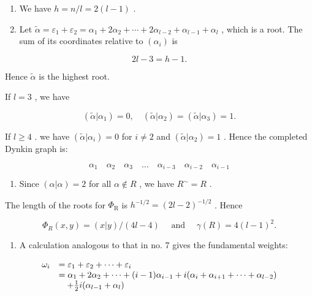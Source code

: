 \begin{enumerate}
\def\labelenumi{(\Roman{enumi})}
\setcounter{enumi}{2}
\item
  We have \(h = n / l = 2(l - 1)\) .
\item
  Let \(\tilde{\alpha} = \varepsilon_{1} + \varepsilon_{2} = \alpha_{1} + 2\alpha_{2} + \cdots + 2\alpha_{l-2} + \alpha_{l-1} + \alpha_{l}\) , which is a root. The sum of its coordinates relative to \((\alpha_{i})\) is
\end{enumerate}

\[
2 l - 3 = h - 1.
\]

Hence \(\tilde{\alpha}\) is the highest root.

If \(l = 3\) , we have

\[
(\tilde {\alpha} | \alpha_ {1}) = 0, \quad (\tilde {\alpha} | \alpha_ {2}) = (\tilde {\alpha} | \alpha_ {3}) = 1.
\]

If \(l \geqslant 4\) . we have \((\tilde{\alpha}|\alpha_i) = 0\) for \(i \neq 2\) and \((\tilde{\alpha}|\alpha_2) = 1\) . Hence the completed Dynkin graph is:

\[
\alpha_ {1} \quad \alpha_ {2} \quad \alpha_ {3} \quad \dots \quad \alpha_ {i - 3} \quad \alpha_ {i - 2} \quad \alpha_ {i - 1}
\]

\begin{enumerate}
\def\labelenumi{(\Alph{enumi})}
\setcounter{enumi}{21}
\tightlist
\item
  Since \((\alpha |\alpha) = 2\) for all \(\alpha \notin R\) , we have \(R^{\sim} = R\) .
\end{enumerate}

The length of the roots for \(\Phi_{\mathrm{R}}\) is \(h^{-1 / 2} = (2l - 2)^{-1 / 2}\) . Hence

\[
\Phi_ {R} (x, y) = (x | y) / (4 l - 4) \quad \text { and } \quad \gamma (R) = 4 (l - 1) ^ {2}.
\]

\begin{enumerate}
\def\labelenumi{(\Roman{enumi})}
\setcounter{enumi}{5}
\tightlist
\item
  A calculation analogous to that in no. 7 gives the fundamental weights:
\end{enumerate}

\[
\begin{array}{r l} \omega_ {i} & = \varepsilon_ {1} + \varepsilon_ {2} + \dots + \varepsilon_ {i} \\ & = \alpha_ {1} + 2 \alpha_ {2} + \dots + (i - 1) \alpha_ {i - 1} + i (\alpha_ {i} + \alpha_ {i + 1} + \dots + \alpha_ {l - 2}) \\ & \quad + \frac {1}{2} i (\alpha_ {l - 1} + \alpha_ {l}) \end{array}
\]

